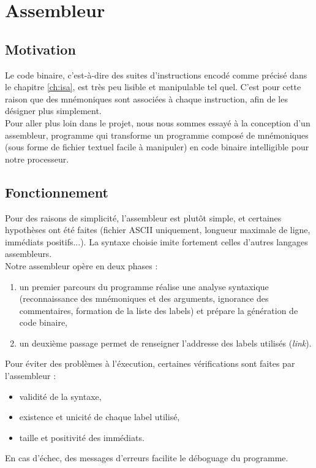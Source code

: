 \chapter{Assembleur}
\label{ch:assembleur}

\section{Motivation}

Le code binaire, c'est-à-dire des suites d'instructions encodé comme précisé
dans le chapitre \ref{ch:isa}, est très peu lisible et manipulable tel quel.
C'est pour cette raison que des mnémoniques sont associées à chaque instruction,
afin de les désigner plus simplement. \\

Pour aller plus loin dans le projet, nous nous sommes essayé à la conception
d'un assembleur, programme qui transforme un programme composé de mnémoniques
(sous forme de fichier textuel facile à manipuler) en code binaire
intelligible pour notre processeur.

\section{Fonctionnement}

Pour des raisons de simplicité, l'assembleur est plutôt simple, et certaines
hypothèses ont été faites (fichier ASCII uniquement, longueur maximale de
ligne, immédiats positifs...). La syntaxe choisie imite fortement celles
d'autres langages assembleurs. \\

Notre assembleur opère en deux phases :
\begin{enumerate}
\item un premier parcours du programme réalise une analyse syntaxique
    (reconnaissance des mnémoniques et des arguments, ignorance des
    commentaires, formation de la liste des labels) et prépare la génération de
    code binaire,
\item un deuxième passage permet de renseigner l'addresse des labels utilisés
    (\textit{link}). \\
\end{enumerate}

Pour éviter des problèmes à l'éxecution, certaines vérifications sont faites
par l'assembleur :
\begin{itemize}
\item validité de la syntaxe,
\item existence et unicité de chaque label utilisé,
\item taille et positivité des immédiats.
\end{itemize}
En cas d'échec, des messages d'erreurs facilite le déboguage du programme.

